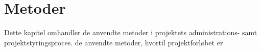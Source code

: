 \chapter{Metoder}

Dette kapitel omhandler de anvendte metoder i projektets administrations- samt projektstyringsproces.  de anvendte metoder, hvortil projektforløbet er 

 